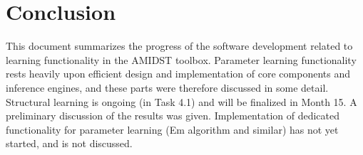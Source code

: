 \documentclass[11pt, oneside]{article}   	%
\begin{document}
 

 


\section{Conclusion}

This document summarizes the progress of the software development related to learning functionality in the AMIDST toolbox. Parameter learning functionality rests heavily upon efficient design and implementation of core components and inference engines, and these parts were therefore discussed in some detail. Structural learning is ongoing (in Task 4.1) and will be finalized in Month 15. A preliminary discussion of the results was given.
Implementation of dedicated functionality for parameter learning (Em algorithm and similar) has not yet started, and is not discussed.




\end{document}
